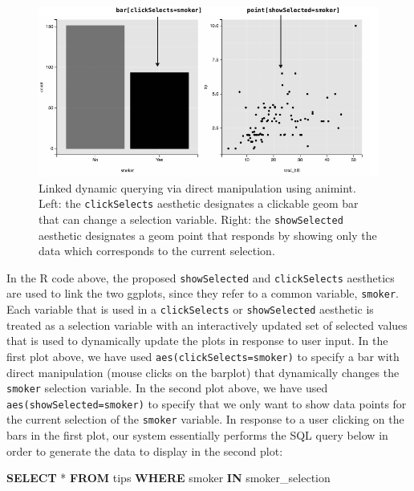 \documentclass[12pt,]{article}
\newenvironment{Shaded}{\begin{snugshade}}{\end{snugshade}}
\newcommand{\KeywordTok}[1]{\textcolor[rgb]{0.13,0.29,0.53}{\textbf{#1}}}
\newcommand{\NormalTok}[1]{#1}
\theoremstyle{definition}
\theoremstyle{definition}
\theoremstyle{definition}
\theoremstyle{remark}
\begin{document}
\begin{figure}
\centering
\includegraphics{images/figure-tips}
\caption{\label{fig:tips}Linked dynamic querying via direct manipulation
using animint. Left: the \texttt{clickSelects} aesthetic designates a
clickable geom bar that can change a selection variable. Right: the
\texttt{showSelected} aesthetic designates a geom point that responds by
showing only the data which corresponds to the current selection.}
\end{figure}

In the R code above, the proposed \texttt{showSelected} and
\texttt{clickSelects} aesthetics are used to link the two ggplots, since
they refer to a common variable, \texttt{smoker}. Each variable that is
used in a \texttt{clickSelects} or \texttt{showSelected} aesthetic is
treated as a selection variable with an interactively updated set of
selected values that is used to dynamically update the plots in response
to user input. In the first plot above, we have used
\texttt{aes(clickSelects=smoker)} to specify a bar with direct
manipulation (mouse clicks on the barplot) that dynamically changes the
\texttt{smoker} selection variable. In the second plot above, we have
used \texttt{aes(showSelected=smoker)} to specify that we only want to
show data points for the current selection of the \texttt{smoker}
variable. In response to a user clicking on the bars in the first plot,
our system essentially performs the SQL query below in order to generate
the data to display in the second plot:

\begin{Shaded}
\begin{Highlighting}[]
\KeywordTok{SELECT}\NormalTok{ * }\KeywordTok{FROM}\NormalTok{ tips}
  \KeywordTok{WHERE}\NormalTok{ smoker }\KeywordTok{IN}\NormalTok{ smoker_selection}
\end{Highlighting}
\end{Shaded}
\end{document}
